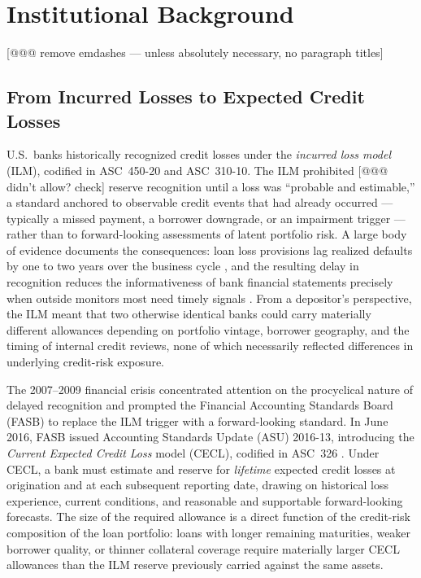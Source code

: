 
\section{Institutional Background}
[@@@ remove emdashes --- unless absolutely necessary, no paragraph titles]
\label{sec:background}

\subsection{From Incurred Losses to Expected Credit Losses}
\label{sec:background:transition}

U.S.\ banks historically recognized credit losses under the \textit{incurred
loss model} (ILM), codified in ASC~450-20 and ASC~310-10.  The ILM prohibited [@@@ didn't allow? check]
reserve recognition until a loss was ``probable and estimable,'' a standard
anchored to observable credit events that had already occurred --- typically a
missed payment, a borrower downgrade, or an impairment trigger --- rather than
to forward-looking assessments of latent portfolio risk.  A large body of
evidence documents the consequences: loan loss provisions lag realized defaults
by one to two years over the business cycle \citep{beatty2011delays}, and the
resulting delay in recognition reduces the informativeness of bank financial
statements precisely when outside monitors most need timely signals
\citep{bushman2012accounting, bushman2015delayed}.  From a depositor's
perspective, the ILM meant that two otherwise identical banks could carry
materially different allowances depending on portfolio vintage, borrower
geography, and the timing of internal credit reviews, none of which necessarily
reflected differences in underlying credit-risk exposure.

The 2007--2009 financial crisis concentrated attention on the procyclical
nature of delayed recognition and prompted the Financial Accounting Standards
Board (FASB) to replace the ILM trigger with a forward-looking standard.  In
June 2016, FASB issued Accounting Standards Update (ASU) 2016-13, introducing
the \textit{Current Expected Credit Loss} model (CECL), codified in ASC~326
\citep{FASB2016}.  Under CECL, a bank must estimate and reserve for
\textit{lifetime} expected credit losses at origination and at each subsequent
reporting date, drawing on historical loss experience, current conditions, and
reasonable and supportable forward-looking forecasts.  The size of the required
allowance is a direct function of the credit-risk composition of the loan
portfolio: loans with longer remaining maturities, weaker borrower quality, or
thinner collateral coverage require materially larger CECL allowances than the
ILM reserve previously carried against the same assets.


